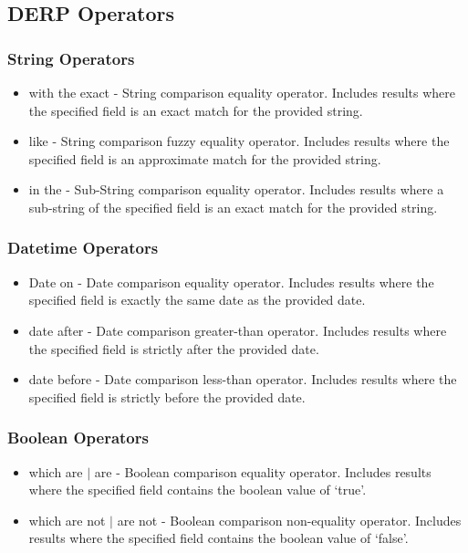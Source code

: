 \subsection{DERP Operators}
\subsubsection{String Operators}
\label{sub:DerpOperators}
\begin{itemize}
\item with the exact - String comparison equality operator. Includes results where the specified field is an exact match for the provided string.
\item like - String comparison fuzzy equality operator. Includes results where the specified field is an approximate match for the provided string.
\item in the - Sub-String comparison equality operator. Includes results where a sub-string of the specified field is an exact match for the provided string.
\end{itemize}
\subsubsection{Datetime Operators}
\begin{itemize}
\item Date on - Date comparison equality operator. Includes results where the specified field is exactly the same date as the provided date.
\item date after - Date comparison greater-than operator. Includes results where the specified field is strictly after the provided date.
\item date before - Date comparison less-than operator. Includes results where the specified field is strictly before the provided date.
\end{itemize}
\subsubsection{Boolean Operators}
\begin{itemize}
\item which are $|$ are - Boolean comparison equality operator. Includes results where the specified field contains the boolean value of `true'.
\item which are not $|$ are not - Boolean comparison non-equality operator. Includes results where the specified field contains the boolean value of `false'.
\end{itemize}
